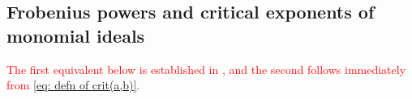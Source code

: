 \documentclass[11pt]{amsart}
\begin{document}
{%


\subsection{Frobenius powers and critical exponents of monomial ideals}

% 
% 

\textcolor{red}{The first equivalent below is established in \cite[Proposition 2.5]{hernandez+etal.frobenius_examples}, and the second follows immediately from \eqref{eq: defn of crit(a,b)}.}


}
\end{document}
